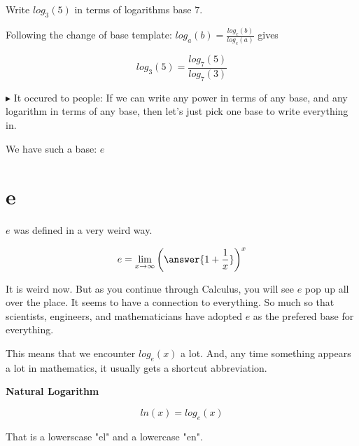 \documentclass{ximera}
\begin{document}
\begin{example}


Write $log_3(5)$ in terms of logarithms base $7$.


\begin{explanation}


Following the change of base template: $log_a(b)  =  \frac{log_c(b)}{log_c(a)} $ gives



\[   log_3(5)  =  \frac{log_7(5)}{log_7(3)}         \]



\end{explanation}
\end{example}


















$\blacktriangleright$ It occured to people: If we can write any power in terms of any base, and any logarithm in terms of any base, then let's just pick one base to write everything in.


We have such a base: $e$


\section{e}



$e$ was defined in a very weird way.

\[   e = \lim_{x \to \infty}  \left(\answer{1 + \frac{1}{x}}\right)^x      \]


It is weird now.  But as you continue through Calculus, you will see $e$ pop up all over the place.  It seems to have a connection to everything.  So much so that scientists, engineers, and mathematicians have  adopted $e$ as the prefered base for everything.


This means that we encounter $log_e(x)$ a lot.  And, any time something appears a lot in mathematics, it usually gets a shortcut abbreviation.




\begin{definition}  \textbf{\textcolor{green!50!black}{Natural Logarithm}} 


\[     ln(x) = log_e(x) \]


That is a lowerscase "el" and a lowercase "en".


\end{definition}
\end{document}
